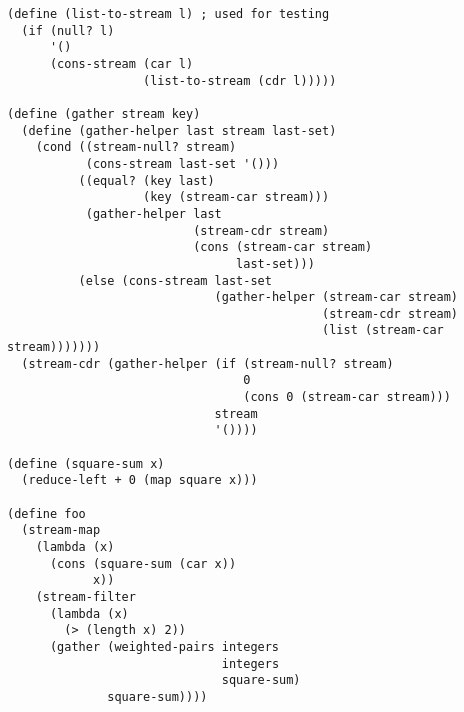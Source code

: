 \documentclass[../main.tex]{subfiles}
\begin{document}
\begin{lstlisting}
(define (list-to-stream l) ; used for testing
  (if (null? l)
      '()
      (cons-stream (car l)
                   (list-to-stream (cdr l)))))

(define (gather stream key)
  (define (gather-helper last stream last-set)
    (cond ((stream-null? stream)
           (cons-stream last-set '()))
          ((equal? (key last)
                   (key (stream-car stream)))
           (gather-helper last
                          (stream-cdr stream)
                          (cons (stream-car stream)
                                last-set)))
          (else (cons-stream last-set
                             (gather-helper (stream-car stream)
                                            (stream-cdr stream)
                                            (list (stream-car stream)))))))
  (stream-cdr (gather-helper (if (stream-null? stream)
                                 0
                                 (cons 0 (stream-car stream)))
                             stream
                             '())))

(define (square-sum x)
  (reduce-left + 0 (map square x)))

(define foo
  (stream-map
    (lambda (x)
      (cons (square-sum (car x))
            x))
    (stream-filter
      (lambda (x)
        (> (length x) 2))
      (gather (weighted-pairs integers
                              integers
                              square-sum)
              square-sum))))
\end{lstlisting}
\end{document}
